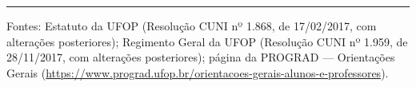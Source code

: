 \documentclass[10pt,a4paper]{extarticle}
\begin{document}
\vspace{0.5cm}
\hrule
\vspace{0.3cm}

\noindent\footnotesize Fontes: Estatuto da UFOP (Resolução CUNI nº 1.868, de 17/02/2017, com alterações posteriores); Regimento Geral da UFOP (Resolução CUNI nº 1.959, de 28/11/2017, com alterações posteriores); página da PROGRAD --- Orientações Gerais (\url{https://www.prograd.ufop.br/orientacoes-gerais-alunos-e-professores}).
\end{document}
